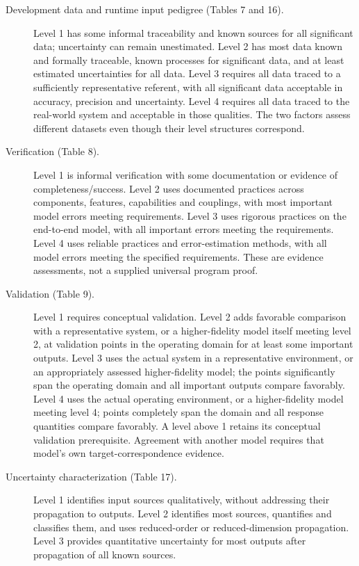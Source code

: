 \begin{description}
\item[Development data and runtime input pedigree (Tables 7 and 16).]
Level 1 has some informal traceability and known sources for all
significant data; uncertainty can remain unestimated. Level 2 has
most data known and formally traceable, known processes for significant
data, and at least estimated uncertainties for all data. Level 3
requires all data traced to a sufficiently representative referent,
with all significant data acceptable in accuracy, precision and
uncertainty. Level 4 requires all data traced to the real-world
system and acceptable in those qualities. The two factors assess
different datasets even though their level structures correspond.
\item[Verification (Table 8).]
Level 1 is informal verification with some documentation or evidence
of completeness/success. Level 2 uses documented practices across
components, features, capabilities and couplings, with most important
model errors meeting requirements. Level 3 uses rigorous practices
on the end-to-end model, with all important errors meeting the
requirements. Level 4 uses reliable practices and error-estimation
methods, with all model errors meeting the specified requirements.
These are evidence assessments, not a supplied universal program proof.
\item[Validation (Table 9).]
Level 1 requires conceptual validation. Level 2 adds favorable
comparison with a representative system, or a higher-fidelity model
itself meeting level 2, at validation points in the operating domain
for at least some important outputs. Level 3 uses the actual system
in a representative environment, or an appropriately assessed
higher-fidelity model; the points significantly span the operating
domain and all important outputs compare favorably. Level 4 uses
the actual operating environment, or a higher-fidelity model meeting
level 4; points completely span the domain and all response
quantities compare favorably. A level above 1 retains its conceptual
validation prerequisite. Agreement with another model requires
that model's own target-correspondence evidence.
\item[Uncertainty characterization (Table 17).]
Level 1 identifies input sources qualitatively, without addressing
their propagation to outputs. Level 2 identifies most sources,
quantifies and classifies them, and uses reduced-order or
reduced-dimension propagation. Level 3 provides quantitative
uncertainty for most outputs after propagation of all known sources.

\end{description}
